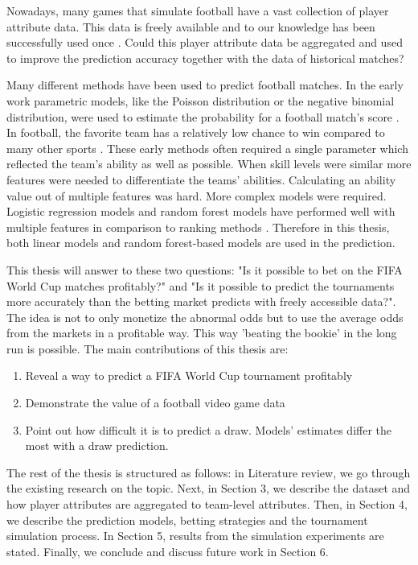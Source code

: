 Nowadays,  many games that simulate football have a vast collection of player attribute data. This data is freely available and to our knowledge has been successfully used once \cite{shin2014novel}. Could this player attribute data be aggregated and used to improve the prediction accuracy together with the data of historical matches?

Many different methods have been used to predict football matches. In the early work parametric models, like the Poisson distribution or the negative binomial distribution, were used to estimate the probability for a football match's score \cite{moroney1962facts, dixon1997}. In football, the favorite team has a relatively low chance to win compared to many other sports \cite{anderson2013numbers}. These early methods often required a single parameter which reflected the team's ability as well as possible. When skill levels were similar more features were needed to differentiate the teams' abilities. Calculating an ability value out of multiple features was hard. More complex models were required. Logistic regression models and random forest models have performed well with multiple features in comparison to ranking methods \cite{groll2018prediction, 10.1007/978-3-319-29504-6_48}. Therefore in this thesis, both linear models and random forest-based models are used in the prediction.

This thesis will answer to these two questions: "Is it possible to bet on the FIFA World Cup matches profitably?" and "Is it possible to predict the tournaments more accurately than the betting market predicts with freely accessible data?". The idea is not to only monetize the abnormal odds but to use the average odds from the markets in a profitable way. This way 'beating the bookie' in the long run is possible. The main contributions of this thesis are:
\begin{enumerate}
    \item Reveal a way to predict a FIFA World Cup tournament profitably
    \item Demonstrate the value of a football video game data
    \item Point out how difficult it is to predict a draw. Models' estimates differ the most with a draw prediction.
\end{enumerate}

The rest of the thesis is structured as follows: in Literature review, we go through the existing research on the topic. Next, in Section 3, we describe the dataset and how player attributes are aggregated to team-level attributes. Then, in Section 4, we describe the prediction models, betting strategies and the tournament simulation process. In Section 5, results from the simulation experiments are stated. Finally, we conclude and discuss future work in Section 6.